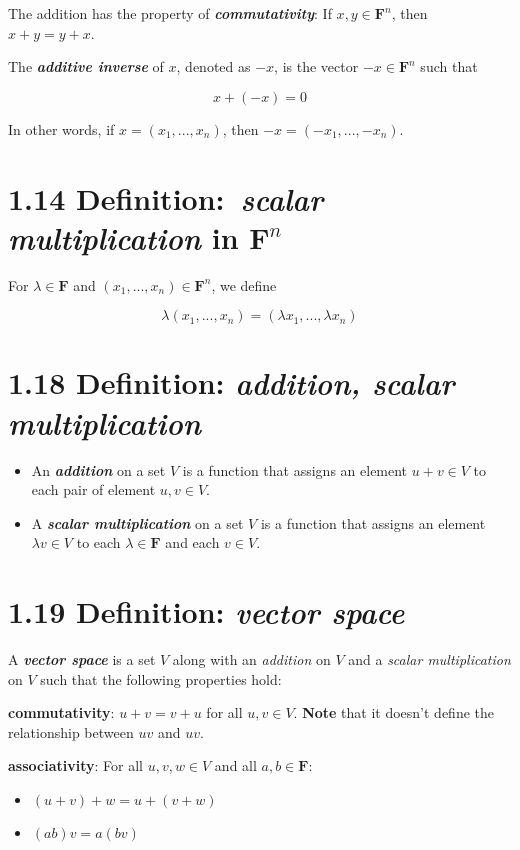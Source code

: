 \documentclass[12pt, letterpaper, oneside]{book}
\begin{document}
The addition has the property of \textbf{\textit{commutativity}}: If $x, y \in
\mathbf{F}^n$, then $x + y = y + x$.

The \textbf{\textit{additive inverse}} of $x$, denoted as $-x$, is the vector
$-x \in \mathbf{F}^n$ such that

\[
  x + (-x) = 0
\]

In other words, if $x = (x_1, ..., x_n)$, then $-x = (-x_1, ..., -x_n)$.

\section*{1.14 Definition:\
  \textbf{\textit{scalar multiplication}} in $\mathbf{F}^n$}

For $\lambda \in \mathbf{F}$ and $(x_1, ..., x_n) \in \mathbf{F}^n$, we define

\[
  \lambda(x_1, ..., x_n) = (\lambda x_1, ..., \lambda x_n)
\]

\section*{1.18 Definition: \it{addition}, \it{scalar multiplication}}

\begin{itemize}
  \item An \textbf{\textit{addition}} on a set $V$ is a function that assigns
    an element $u+v \in V$ to each pair of element $u, v \in V$.
  \item A \textbf{\textit{scalar multiplication}} on a set $V$ is a function
    that assigns an element $\lambda v \in V$ to each $\lambda \in \mathbf{F}$
    and each $v \in V$.
\end{itemize}

\section*{1.19 Definition: \textbf{\textit{vector space}}}

A \textbf{\textit{vector space}} is a set $V$ along with an \textit{addition}
on $V$ and a \textit{scalar multiplication} on $V$ such that the following
properties hold:

\textbf{commutativity}: $u + v = v + u$ for all $u, v \in V$. \textbf{Note}
that it doesn't define the relationship between $uv$ and $uv$.

\textbf{associativity}: For all $u, v, w \in V$ and all $a, b \in \mathbf{F}$:
\begin{itemize}
  \item $(u + v) + w = u + (v + w)$
  \item $(ab)v = a(bv)$
\end{itemize}
\end{document}

